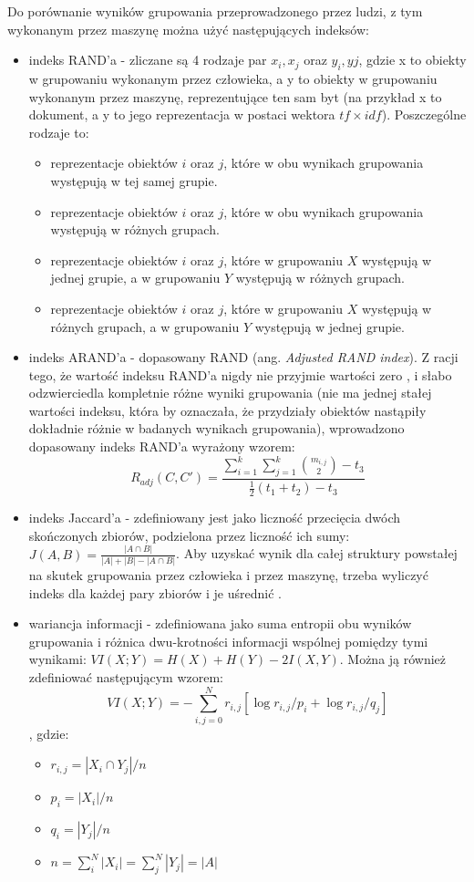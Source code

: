 \documentclass{article}
\begin{document}
Do porównanie wyników grupowania przeprowadzonego przez ludzi, z tym wykonanym przez maszynę można użyć następujących indeksów: 
\begin{itemize}
	\item indeks RAND'a - zliczane są 4 rodzaje par $x_{i}, x_{j}$ oraz $y_{i}, y{j}$, gdzie x to obiekty w grupowaniu wykonanym przez człowieka, a y to obiekty w grupowaniu wykonanym przez maszynę, reprezentujące ten sam byt (na przykład x to dokument, a y to jego reprezentacja w postaci wektora $tf \times idf$). Poszczególne rodzaje to:
	\begin{itemize}
		\item reprezentacje obiektów $i$ oraz $j$, które w obu wynikach grupowania występują w tej samej grupie.
		\item reprezentacje obiektów $i$ oraz $j$, które w obu wynikach grupowania występują w różnych grupach.
		\item reprezentacje obiektów $i$ oraz $j$, które w grupowaniu $X$ występują w jednej grupie, a w grupowaniu $Y$ występują w różnych grupach.
		\item reprezentacje obiektów $i$ oraz $j$, które w grupowaniu $X$ występują w różnych grupach, a w grupowaniu $Y$ występują w jednej grupie.
	\end{itemize}
	\item indeks ARAND'a - dopasowany RAND (ang. \textit{Adjusted RAND index}). Z racji tego, że wartość indeksu RAND'a nigdy nie przyjmie wartości zero \cite{wagner2007comparing}, i słabo odzwierciedla kompletnie różne wyniki grupowania (nie ma jednej stałej wartości indeksu, która by oznaczała, że przydziały obiektów nastąpiły dokładnie różnie w badanych wynikach grupowania), wprowadzono dopasowany indeks RAND'a wyrażony wzorem: 
	\[ R_{adj}(C,C') = \frac{\sum_{i=1}^{k}\sum_{j=1}^{k} {m_{i,j}\choose{2}} - t_{3}}{\frac{1}{2}(t_{1} + t_{2}) - t_{3}}  \]
	\item indeks Jaccard'a - zdefiniowany jest jako liczność przecięcia dwóch skończonych zbiorów, podzielona przez liczność ich sumy: $ J(A,B) = \frac{|A \cap B|}{|A| + |B| - |A \cap B|} $.
	Aby uzyskać wynik dla całej struktury powstałej na skutek grupowania przez człowieka i przez maszynę, trzeba wyliczyć indeks dla każdej pary zbiorów i je uśrednić . 
	\item wariancja informacji - zdefiniowana jako suma entropii obu wyników grupowania i różnica dwu-krotności informacji wspólnej pomiędzy tymi wynikami: $ VI(X;Y) = H(X) + H(Y) - 2I(X,Y) $. Można ją również zdefiniować następującym wzorem: \[ VI(X;Y) = -\sum_{i,j=0}^{N}r_{i,j}[\log{r_{i,j}/p_{i}} + \log{r_{i,j}/q_{j}}] \]
	, gdzie:
	\begin{itemize}
		\item $ r_{i,j} = |X_{i} \cap Y_{j}| / n$
		\item $ p_{i} = |X_{i}|/n $
		\item $ q_{i} = |Y_{j}|/n $
		\item $ n = \sum_{i}^{N} |X_{i}| = \sum_{j}^{N} |Y_{j}| = |A|$
	\end{itemize}
\end{itemize}
\end{document}
